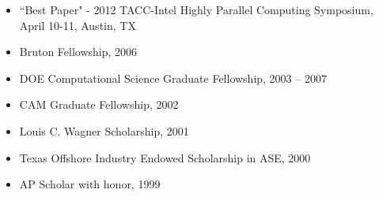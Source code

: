 \vspace{-0.3in}

\begin{itemize}
	\itemsep 0pt
	\item ``Best Paper" - 2012 TACC-Intel Highly Parallel Computing Symposium, April 10-11, Austin, TX
	\item Bruton Fellowship, 2006
	\item DOE Computational Science Graduate Fellowship, 2003 -- 2007
	\item CAM Graduate Fellowship, 2002
	\item Louis C. Wagner Scholarship, 2001
	\item Texas Offshore Industry Endowed Scholarship in ASE, 2000
	\item AP Scholar with honor, 1999
\end{itemize}

